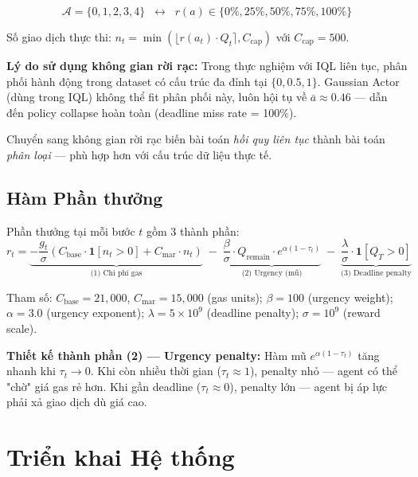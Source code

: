\begin{equation}
    \mathcal{A} = \{0, 1, 2, 3, 4\}\;\; \leftrightarrow \;\; r(a) \in \{0\%, 25\%, 50\%, 75\%, 100\%\}
\end{equation}

Số giao dịch thực thi: $n_t = \min\!\left(\!\lfloor r(a_t)\cdot Q_t \rceil, C_{\text{cap}}\right)$ với $C_{\text{cap}} = 500$.

\textbf{Lý do sử dụng không gian rời rạc:} Trong thực nghiệm với IQL liên tục, phân phối hành động trong dataset có cấu trúc đa đỉnh tại $\{0, 0.5, 1\}$. Gaussian Actor (dùng trong IQL) không thể fit phân phối này, luôn hội tụ về $\bar{a}\approx 0.46$ — dẫn đến policy collapse hoàn toàn (deadline miss rate = 100\%).

Chuyển sang không gian rời rạc biến bài toán \textit{hồi quy liên tục} thành bài toán \textit{phân loại} — phù hợp hơn với cấu trúc dữ liệu thực tế.

\subsection{Hàm Phần thưởng}

Phần thưởng tại mỗi bước $t$ gồm 3 thành phần:
\begin{equation}
    r_t = \underbrace{-\frac{g_t}{\sigma}\!\left(C_{\text{base}}\cdot\mathbf{1}[n_t>0] + C_{\text{mar}}\cdot n_t\right)}_{\text{(1) Chi phí gas}} \;-\; \underbrace{\frac{\beta}{\sigma}\cdot Q_{\text{remain}}\cdot e^{\alpha(1-\tau_t)}}_{\text{(2) Urgency (mũ)}}\; -\; \underbrace{\frac{\lambda}{\sigma}\cdot\mathbf{1}[Q_T > 0]}_{\text{(3) Deadline penalty}}
    \label{eq:reward}
\end{equation}

Tham số: $C_{\text{base}}=21{,}000$, $C_{\text{mar}}=15{,}000$ (gas units); $\beta=100$ (urgency weight); $\alpha=3.0$ (urgency exponent); $\lambda=5\times10^9$ (deadline penalty); $\sigma=10^9$ (reward scale).

\textbf{Thiết kế thành phần (2) — Urgency penalty:} Hàm mũ $e^{\alpha(1-\tau_t)}$ tăng nhanh khi $\tau_t\to 0$. Khi còn nhiều thời gian ($\tau_t\approx 1$), penalty nhỏ — agent có thể "chờ" giá gas rẻ hơn. Khi gần deadline ($\tau_t\approx 0$), penalty lớn — agent bị áp lực phải xả giao dịch dù giá cao.

\section{Triển khai Hệ thống}


